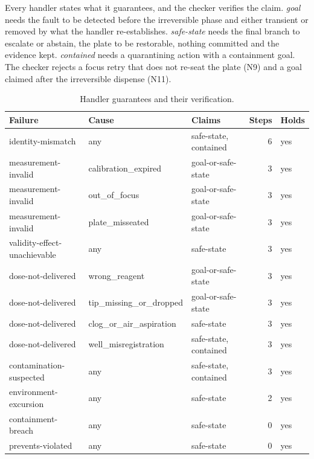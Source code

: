 \documentclass[10pt,a4paper]{article}
\begin{document}
Every handler states what it guarantees, and the checker verifies the claim. \emph{goal} needs the fault to be detected before the irreversible phase and either transient or removed by what the handler re-establishes. \emph{safe-state} needs the final branch to escalate or abstain, the plate to be restorable, nothing committed and the evidence kept. \emph{contained} needs a quarantining action with a containment goal. The checker rejects a focus retry that does not re-seat the plate (N9) and a goal claimed after the irreversible dispense (N11).

\begin{table}[tbp]\centering\small
\caption{Handler guarantees and their verification.}\label{tab:guarantees}
\begin{tabularx}{\linewidth}{lllrl}\toprule
\textbf{Failure} & \textbf{Cause} & \textbf{Claims} & \textbf{Steps} & \textbf{Holds} \\\midrule
identity-mismatch & any & safe-state, contained & 6 & yes \\
measurement-invalid & calibration\_\allowbreak{}expired & goal-or-safe-state & 3 & yes \\
measurement-invalid & out\_\allowbreak{}of\_\allowbreak{}focus & goal-or-safe-state & 3 & yes \\
measurement-invalid & plate\_\allowbreak{}misseated & goal-or-safe-state & 3 & yes \\
validity-effect-unachievable & any & safe-state & 3 & yes \\
dose-not-delivered & wrong\_\allowbreak{}reagent & goal-or-safe-state & 3 & yes \\
dose-not-delivered & tip\_\allowbreak{}missing\_\allowbreak{}or\_\allowbreak{}dropped & goal-or-safe-state & 3 & yes \\
dose-not-delivered & clog\_\allowbreak{}or\_\allowbreak{}air\_\allowbreak{}aspiration & safe-state & 3 & yes \\
dose-not-delivered & well\_\allowbreak{}misregistration & safe-state, contained & 3 & yes \\
contamination-suspected & any & safe-state, contained & 3 & yes \\
environment-excursion & any & safe-state & 2 & yes \\
containment-breach & any & safe-state & 0 & yes \\
prevents-violated & any & safe-state & 0 & yes \\\bottomrule
\end{tabularx}
\end{table}
\end{document}
